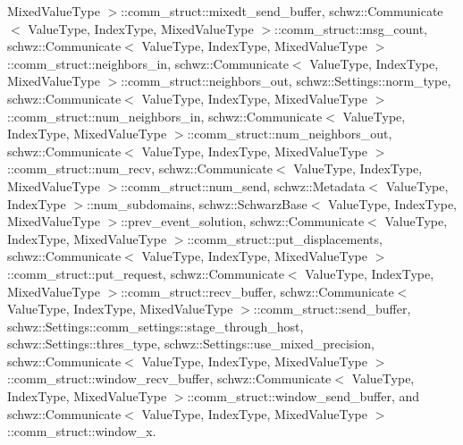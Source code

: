 Mixed\+Value\+Type $>$\+::comm\+\_\+struct\+::mixedt\+\_\+send\+\_\+buffer, schwz\+::\+Communicate$<$ Value\+Type, Index\+Type, Mixed\+Value\+Type $>$\+::comm\+\_\+struct\+::msg\+\_\+count, schwz\+::\+Communicate$<$ Value\+Type, Index\+Type, Mixed\+Value\+Type $>$\+::comm\+\_\+struct\+::neighbors\+\_\+in, schwz\+::\+Communicate$<$ Value\+Type, Index\+Type, Mixed\+Value\+Type $>$\+::comm\+\_\+struct\+::neighbors\+\_\+out, schwz\+::\+Settings\+::norm\+\_\+type, schwz\+::\+Communicate$<$ Value\+Type, Index\+Type, Mixed\+Value\+Type $>$\+::comm\+\_\+struct\+::num\+\_\+neighbors\+\_\+in, schwz\+::\+Communicate$<$ Value\+Type, Index\+Type, Mixed\+Value\+Type $>$\+::comm\+\_\+struct\+::num\+\_\+neighbors\+\_\+out, schwz\+::\+Communicate$<$ Value\+Type, Index\+Type, Mixed\+Value\+Type $>$\+::comm\+\_\+struct\+::num\+\_\+recv, schwz\+::\+Communicate$<$ Value\+Type, Index\+Type, Mixed\+Value\+Type $>$\+::comm\+\_\+struct\+::num\+\_\+send, schwz\+::\+Metadata$<$ Value\+Type, Index\+Type $>$\+::num\+\_\+subdomains, schwz\+::\+Schwarz\+Base$<$ Value\+Type, Index\+Type, Mixed\+Value\+Type $>$\+::prev\+\_\+event\+\_\+solution, schwz\+::\+Communicate$<$ Value\+Type, Index\+Type, Mixed\+Value\+Type $>$\+::comm\+\_\+struct\+::put\+\_\+displacements, schwz\+::\+Communicate$<$ Value\+Type, Index\+Type, Mixed\+Value\+Type $>$\+::comm\+\_\+struct\+::put\+\_\+request, schwz\+::\+Communicate$<$ Value\+Type, Index\+Type, Mixed\+Value\+Type $>$\+::comm\+\_\+struct\+::recv\+\_\+buffer, schwz\+::\+Communicate$<$ Value\+Type, Index\+Type, Mixed\+Value\+Type $>$\+::comm\+\_\+struct\+::send\+\_\+buffer, schwz\+::\+Settings\+::comm\+\_\+settings\+::stage\+\_\+through\+\_\+host, schwz\+::\+Settings\+::thres\+\_\+type, schwz\+::\+Settings\+::use\+\_\+mixed\+\_\+precision, schwz\+::\+Communicate$<$ Value\+Type, Index\+Type, Mixed\+Value\+Type $>$\+::comm\+\_\+struct\+::window\+\_\+recv\+\_\+buffer, schwz\+::\+Communicate$<$ Value\+Type, Index\+Type, Mixed\+Value\+Type $>$\+::comm\+\_\+struct\+::window\+\_\+send\+\_\+buffer, and schwz\+::\+Communicate$<$ Value\+Type, Index\+Type, Mixed\+Value\+Type $>$\+::comm\+\_\+struct\+::window\+\_\+x.

\mbox{\label{classschwz_1_1SolverRAS_ae0d9bc193a40fb1f27738a2436a3fa36}} 
